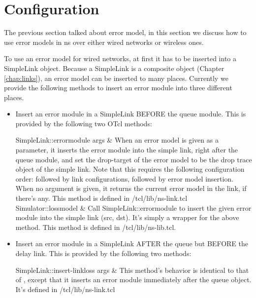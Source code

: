 
\section{Configuration}

The previous section talked about error model, in this section we
discuss how to use error models in ns over either wired networks or
wireless ones. 

To use an error model for wired networks, at first it has to be
inserted into a SimpleLink object. Because a SimpleLink is a composite
object (Chapter \ref{chap:links}), an error model can be inserted to
many places. Currently we provide the following methods to insert an
error module into three different places.

\begin{itemize}
\item Insert an error module in a SimpleLink BEFORE the queue module. 
  This is provided by the following two OTcl methods: 

  \begin{alist}
    SimpleLink::errormodule args & When an error model is given
    as a parameter, it inserts the error module into the simple link,
    right after the queue module, and set the drop-target of the error
    model to be the drop trace object of the simple link. Note that
    this requires the following configuration order:
  followed by link configurations, followed by error
    model insertion. When no argument is given, it returns the current
    error model in the link, if there's any. This method is defined in
    \ns/tcl/lib/ns-link.tcl \\

    Simulator::lossmodel    & Call
    SimpleLink::errormodule to insert the given error module into the
    simple link (src, dst). It's simply a wrapper for the above
    method. This method is defined in \ns/tcl/lib/ns-lib.tcl. 
  \end{alist}
  
\item Insert an error module in a SimpleLink AFTER the queue but
  BEFORE the delay link.
  This is provided by the following two methods:

  \begin{alist}
    SimpleLink::insert-linkloss args & This method's behavior
    is identical to that of , except
    that it inserts an error module immediately after the queue
    object. It's defined in \ns/tcl/lib/ns-link.tcl \\


\end{alist}
\end{itemize}
